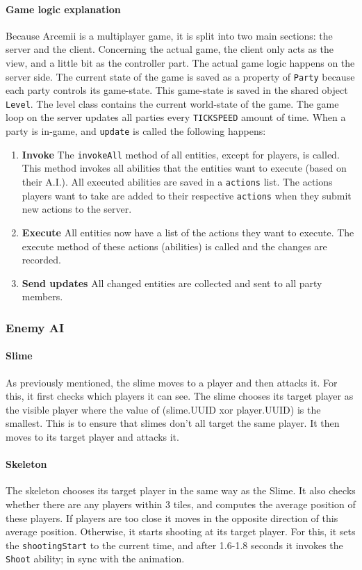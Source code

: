 \documentclass[../main.tex]{subfiles}
\begin{document}
		\paragraph{Game logic explanation}
		Because Arcemii is a multiplayer game, it is split into two main sections: the server and the client. Concerning the actual game, the client only acts as the view, and a little bit as the controller part. The actual game logic happens on the server side. The current state of the game is saved as a property of \texttt{Party} because each party controls its game-state. This game-state is saved in the shared object \texttt{Level}. The level class contains the current world-state of the game. The game loop on the server updates all parties every \texttt{TICKSPEED} amount of time. When a party is in-game, and \texttt{update} is called the following happens:

		\begin{enumerate}
			\item \textbf{Invoke} The \texttt{invokeAll} method of all entities, except for players, is called. This method invokes all abilities that the entities want to execute (based on their A.I.). All executed abilities are saved in a \texttt{actions} list. The actions players want to take are added to their respective \texttt{actions} when they submit new actions to the server.
			\item \textbf{Execute} All entities now have a list of the actions they want to execute. The execute method of these actions (abilities) is called and the changes are recorded.
			\item \textbf{Send updates} All changed entities are collected and sent to all party members.
		\end{enumerate}
	\subsubsection{Enemy AI}
		\paragraph{Slime}
		As previously mentioned, the slime moves to a player and then attacks it. For this, it first checks which players it can see. The slime chooses its target player as the visible player where the value of (slime.UUID xor player.UUID) is the smallest. This is to ensure that slimes don't all target the same player. It then moves to its target player and attacks it.
		\paragraph{Skeleton}
		The skeleton chooses its target player in the same way as the Slime. It also checks whether there are any players within 3 tiles, and computes the average position of these players. If players are too close it moves in the opposite direction of this average position. Otherwise, it starts shooting at its target player. For this, it sets the \texttt{shootingStart} to the current time, and after 1.6-1.8 seconds it invokes the \texttt{Shoot} ability; in sync with the animation.
\end{document}
